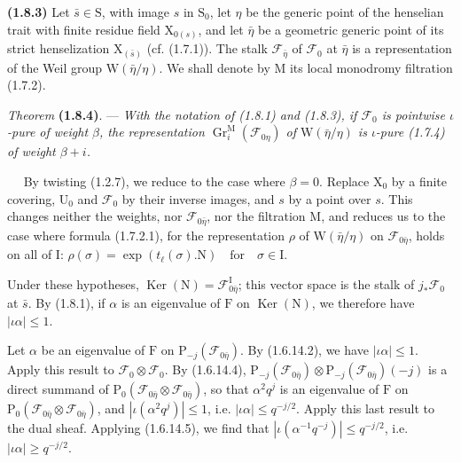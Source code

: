 \documentclass[11pt,leqno]{article}
\newcommand{\Page}[1]{\ifvmode\noindent\else\unskip\ \fi{\footnotesize\textcolor{gray}{[p.\,#1]}}\ \ignorespaces}
\begin{document}
\textbf{(1.8.3)} Let \(\bar{s}\in\mathrm{S}\), with image \(s\) in \(\mathrm{S}_0\), let \(\eta\) be the generic point of the henselian trait with finite residue field \(\mathrm{X}_{0(s)}\), and let \(\bar{\eta}\) be a geometric generic point of its strict henselization \(\mathrm{X}_{(\bar{s})}\) (cf. (1.7.1)). The stalk \(\mathscr{F}_{\bar{\eta}}\) of \(\mathscr{F}_0\) at \(\bar{\eta}\) is a representation of the Weil group \(\mathrm{W}(\bar{\eta}/\eta)\). We shall denote by \(\mathrm{M}\) its local monodromy filtration (1.7.2).

\textit{Theorem} \textbf{(1.8.4)}. — \textit{With the notation of \textup{(1.8.1)} and \textup{(1.8.3)}, if \(\mathscr{F}_0\) is pointwise \(\iota\)-pure of weight \(\beta\), the representation \(\operatorname{Gr}_i^{\mathrm{M}}(\mathscr{F}_{0\eta})\) of \(\mathrm{W}(\bar{\eta}/\eta)\) is \(\iota\)-pure \textup{(1.7.4)} of weight \(\beta+i\).}

\Page{176}
By twisting (1.2.7), we reduce to the case where \(\beta=0\). Replace \(\mathrm{X}_0\) by a finite covering, \(\mathrm{U}_0\) and \(\mathscr{F}_0\) by their inverse images, and \(s\) by a point over \(s\). This changes neither the weights, nor \(\mathscr{F}_{0\bar{\eta}}\), nor the filtration \(\mathrm{M}\), and reduces us to the case where formula (1.7.2.1), for the representation \(\rho\) of \(\mathrm{W}(\bar{\eta}/\eta)\) on \(\mathscr{F}_{0\bar{\eta}}\), holds on all of \(\mathrm{I}\):
\(\rho(\sigma)=\exp(t_\ell(\sigma).\mathrm{N})\quad\text{for}\quad\sigma\in\mathrm{I}\).

Under these hypotheses, \(\operatorname{Ker}(\mathrm{N})=\mathscr{F}_{0\bar{\eta}}^{\mathrm{I}}\); this vector space is the stalk of \(j_*\mathscr{F}_0\) at \(\bar{s}\). By (1.8.1), if \(\alpha\) is an eigenvalue of \(\mathrm{F}\) on \(\operatorname{Ker}(\mathrm{N})\), we therefore have \(|\iota\alpha|\leq1\).

Let \(\alpha\) be an eigenvalue of \(\mathrm{F}\) on \(\mathrm{P}_{-j}(\mathscr{F}_{0\bar{\eta}})\). By (1.6.14.2), we have \(|\iota\alpha|\leq1\). Apply this result to \(\mathscr{F}_0\otimes\mathscr{F}_0\). By (1.6.14.4), \(\mathrm{P}_{-j}(\mathscr{F}_{0\bar{\eta}})\otimes\mathrm{P}_{-j}(\mathscr{F}_{0\bar{\eta}})(-j)\) is a direct summand of \(\mathrm{P}_0(\mathscr{F}_{0\bar{\eta}}\otimes\mathscr{F}_{0\bar{\eta}})\), so that \(\alpha^2q^j\) is an eigenvalue of \(\mathrm{F}\) on \(\mathrm{P}_0(\mathscr{F}_{0\bar{\eta}}\otimes\mathscr{F}_{0\bar{\eta}})\), and \(|\iota(\alpha^2q^j)|\leq1\), i.e. \(|\iota\alpha|\leq q^{-j/2}\). Apply this last result to the dual sheaf. Applying (1.6.14.5), we find that \(|\iota(\alpha^{-1}q^{-j})|\leq q^{-j/2}\), i.e. \(|\iota\alpha|\geq q^{-j/2}\).
\end{document}
